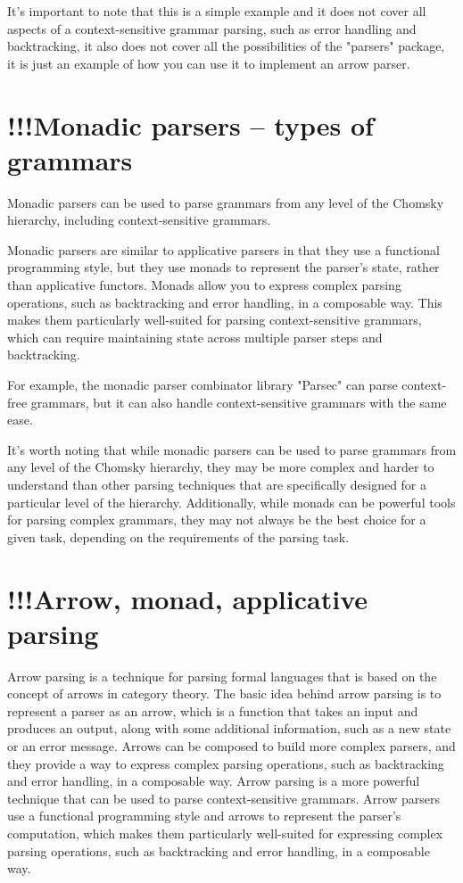 \documentclass[12pt,twoside]{report}
\begin{document}
It's important to note that this is a simple example and it does not cover all aspects of a context-sensitive grammar parsing, such as error handling and backtracking, it also does not cover all the possibilities of the "parsers" package, it is just an example of how you can use it to implement an arrow parser.

\section{!!!Monadic parsers -- types of grammars}
Monadic parsers can be used to parse grammars from any level of the Chomsky hierarchy, including context-sensitive grammars.

Monadic parsers are similar to applicative parsers in that they use a functional programming style, but they use monads to represent the parser's state, rather than applicative functors. Monads allow you to express complex parsing operations, such as backtracking and error handling, in a composable way. This makes them particularly well-suited for parsing context-sensitive grammars, which can require maintaining state across multiple parser steps and backtracking.

For example, the monadic parser combinator library "Parsec" can parse context-free grammars, but it can also handle context-sensitive grammars with the same ease.

It's worth noting that while monadic parsers can be used to parse grammars from any level of the Chomsky hierarchy, they may be more complex and harder to understand than other parsing techniques that are specifically designed for a particular level of the hierarchy. Additionally, while monads can be powerful tools for parsing complex grammars, they may not always be the best choice for a given task, depending on the requirements of the parsing task.

\section{!!!Arrow, monad, applicative parsing}
Arrow parsing is a technique for parsing formal languages that is based on the concept of arrows in category theory. The basic idea behind arrow parsing is to represent a parser as an arrow, which is a function that takes an input and produces an output, along with some additional information, such as a new state or an error message. Arrows can be composed to build more complex parsers, and they provide a way to express complex parsing operations, such as backtracking and error handling, in a composable way.
Arrow parsing is a more powerful technique that can be used to parse context-sensitive grammars. Arrow parsers use a functional programming style and arrows to represent the parser's computation, which makes them particularly well-suited for expressing complex parsing operations, such as backtracking and error handling, in a composable way.
\end{document}
